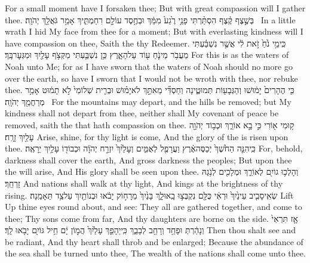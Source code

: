 {For a small moment have I forsaken thee; But with great compassion will I gather thee.}
{בְּשֶׁ֣צֶף קֶ֗צֶף הִסְתַּ֨רְתִּי פָנַ֥י רֶ֙גַע֙ מִמֵּ֔ךְ וּבְחֶ֥סֶד עוֹלָ֖ם רִחַמְתִּ֑יךְ אָמַ֥ר גֹּאֲלֵ֖ךְ יְהֹוָֽה׃ \setuma }
{In a little wrath I hid My face from thee for a moment; But with everlasting kindness will I have compassion on thee, Saith the \lord\space thy Redeemer.}
{כִּֽי\maqqaf מֵ֥י נֹ֙חַ֙ זֹ֣את לִ֔י אֲשֶׁ֣ר נִשְׁבַּ֗עְתִּי מֵעֲבֹ֥ר מֵי\maqqaf נֹ֛חַ ע֖וֹד עַל\maqqaf הָאָ֑רֶץ כֵּ֥ן נִשְׁבַּ֛עְתִּי מִקְּצֹ֥ף עָלַ֖יִךְ וּמִגְּעׇר\maqqaf בָּֽךְ׃}
{For this is as the waters of Noah unto Me; for as I have sworn that the waters of Noah should no more go over the earth, so have I sworn that I would not be wroth with thee, nor rebuke thee.}
{כִּ֤י הֶהָרִים֙ יָמ֔וּשׁוּ וְהַגְּבָע֖וֹת תְּמוּטֶ֑ינָה וְחַסְדִּ֞י מֵאִתֵּ֣ךְ לֹא\maqqaf יָמ֗וּשׁ וּבְרִ֤ית שְׁלוֹמִי֙ לֹ֣א תָמ֔וּט אָמַ֥ר מְרַחֲמֵ֖ךְ יְהֹוָֽה׃ \setuma }
{For the mountains may depart, and the hills be removed; but My kindness shall not depart from thee, neither shall My covenant of peace be removed, saith the \lord\space that hath compassion on thee.}
\label{haft_50}
\setcounter{chap}{60}
\setcounter{verse}{1}
{ק֥וּמִי א֖וֹרִי כִּ֣י בָ֣א אוֹרֵ֑ךְ וּכְב֥וֹד יְהֹוָ֖ה עָלַ֥יִךְ זָרָֽח׃}
{Arise, shine, for thy light is come, And the glory of the \lord\space is risen upon thee.}
{כִּֽי\maqqaf הִנֵּ֤ה הַחֹ֙שֶׁךְ֙ יְכַסֶּה\maqqaf אֶ֔רֶץ וַעֲרָפֶ֖ל לְאֻמִּ֑ים וְעָלַ֙יִךְ֙ יִזְרַ֣ח יְהֹוָ֔ה וּכְבוֹד֖וֹ עָלַ֥יִךְ יֵרָאֶֽה׃}
{For, behold, darkness shall cover the earth, And gross darkness the peoples; But upon thee the \lord\space will arise, And His glory shall be seen upon thee.}
{וְהָלְכ֥וּ גוֹיִ֖ם לְאוֹרֵ֑ךְ וּמְלָכִ֖ים לְנֹ֥גַהּ זַרְחֵֽךְ׃}
{And nations shall walk at thy light, And kings at the brightness of thy rising.}
{שְׂאִֽי\maqqaf סָבִ֤יב עֵינַ֙יִךְ֙ וּרְאִ֔י כֻּלָּ֖ם נִקְבְּצ֣וּ בָֽאוּ\maqqaf לָ֑ךְ בָּנַ֙יִךְ֙ מֵרָח֣וֹק יָבֹ֔אוּ וּבְנוֹתַ֖יִךְ עַל\maqqaf צַ֥ד תֵּאָמַֽנָה׃}
{Lift Up thine eyes round about, and see: They all are gathered together, and come to thee; Thy sons come from far, And thy daughters are borne on the side.}
{אָ֤ז תִּרְאִי֙ וְנָהַ֔רְתְּ וּפָחַ֥ד וְרָחַ֖ב לְבָבֵ֑ךְ כִּֽי\maqqaf יֵהָפֵ֤ךְ עָלַ֙יִךְ֙ הֲמ֣וֹן יָ֔ם חֵ֥יל גּוֹיִ֖ם יָבֹ֥אוּ לָֽךְ׃}
{Then thou shalt see and be radiant, And thy heart shall throb and be enlarged; Because the abundance of the sea shall be turned unto thee, The wealth of the nations shall come unto thee.}
